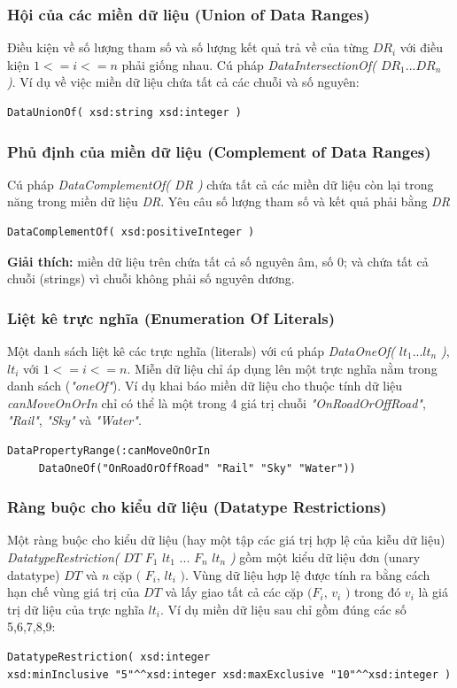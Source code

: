 \subsubsection{Hội của các miền dữ liệu (Union of Data Ranges)}
Điều kiện về số lượng tham số và số lượng kết quả trả về của từng $DR_{i}$ với điều kiện $1 <= i <= n$ phải giống nhau. Cú pháp \textit{DataIntersectionOf( $DR_{1} ... DR_{n}$ )}. Ví dụ về việc miền dữ liệu chứa tất cả các chuỗi và số nguyên:
\begin{verbatim}
DataUnionOf( xsd:string xsd:integer )
\end{verbatim}

\subsubsection{Phủ định của miền dữ liệu (Complement of Data Ranges)}
Cú pháp \textit{DataComplementOf( DR )} chứa tất cả các miền dữ liệu còn lại trong năng trong miền dữ liệu \textit{DR}. Yêu câu số lượng tham số và kết quả phải bằng \textit{DR}
\begin{verbatim}
DataComplementOf( xsd:positiveInteger )
\end{verbatim}
\textbf{Giải thích:} miền dữ liệu trên chứa tất cả số nguyên âm, số 0; và chứa tất cả chuỗi (strings) vì chuỗi không phải số nguyên dương.

\subsubsection{Liệt kê trực nghĩa (Enumeration Of Literals)}
Một danh sách liệt kê các trực nghĩa (literals) với cú pháp \textit{DataOneOf(} $lt_{1} ... lt_{n}$ \textit{)},  $lt_{i}$ với $1 <= i <= n$.  Miễn dữ liệu chỉ áp dụng lên một trực nghĩa nằm trong danh sách (\textit{"oneOf"}). Ví dụ khai báo miền dữ liệu cho thuộc tính dữ liệu \textit{canMoveOnOrIn} chỉ có thể là một trong 4 giá trị chuỗi \textit{"OnRoadOrOffRoad"}, \textit{"Rail"}, \textit{"Sky"} và \textit{"Water"}.
\begin{verbatim}
DataPropertyRange(:canMoveOnOrIn 
     DataOneOf("OnRoadOrOffRoad" "Rail" "Sky" "Water"))
\end{verbatim}

\subsubsection{Ràng buộc cho kiểu dữ liệu (Datatype Restrictions)}
Một ràng buộc cho kiểu dữ liệu (hay một tập các giá trị hợp lệ của kiễu dữ liệu) \textit{DatatypeRestriction(} $DT$ $F_{1}$ $lt_{1}$ ... $F_{n}$ $lt_{n}$ \textit{ )} gồm một kiểu dữ liệu đơn (unary datatype) $DT$ và $n$ cặp $($ $F_{i}$, $lt_{i}$ $)$. Vùng dữ liệu hợp lệ được tính ra bằng cách hạn chế vùng giá trị của $DT$ và lấy giao tất cả các cặp $(F_{i}$, $v_{i}$ $)$ trong đó $v_{i}$ là giá trị dữ liệu của trực nghĩa $lt_{i}$. Ví dụ miền dữ liệu sau chỉ gồm đúng các số 5,6,7,8,9:
\begin{verbatim}
DatatypeRestriction( xsd:integer 
xsd:minInclusive "5"^^xsd:integer xsd:maxExclusive "10"^^xsd:integer )
\end{verbatim}

